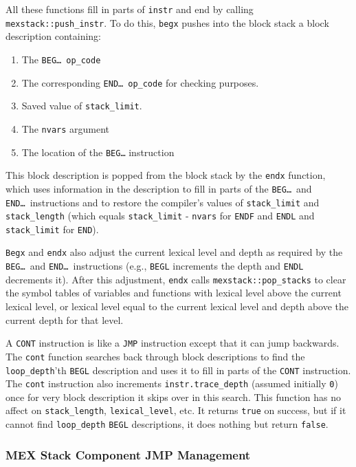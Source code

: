 \documentclass[12pt]{article}
\begin{document}
\begin{indpar}
All these functions fill in parts of {\tt instr} and end by calling
{\tt mexstack::push\_instr}.  To do this, {\tt begx} pushes into the
block stack\label{BLOCK-STACK} a block description containing:
\begin{enumerate}
\item The {\tt BEG\ldots}~{\tt op\_code}
\item The corresponding {\tt END\ldots}~{\tt op\_code} for checking purposes.
\item Saved value of {\tt stack\_limit}.
\item The {\tt nvars} argument
\item The location of the {\tt BEG\ldots} instruction
\end{enumerate}
This block description is popped from the block stack by the {\tt endx}
function, which uses information in the description to fill in parts of the
{\tt BEG\ldots}~and {\tt END\ldots}~instructions and to restore the compiler's
values of {\tt stack\_limit} and {\tt stack\_length} (which equals
{\tt stack\_limit} - {\tt nvars} for {\tt ENDF} and {\tt ENDL}
and {\tt stack\_limit} for {\tt END}).

{\tt Begx} and {\tt endx} also adjust the current lexical level and
depth as required by the {\tt BEG\ldots}~and {\tt END\ldots}~instructions
(e.g., {\tt BEGL} increments the depth and {\tt ENDL} decrements it).
After this adjustment, {\tt endx} calls {\tt mexstack::pop\_stacks}
to clear the symbol tables of variables and functions with
lexical level above the current lexical level, or lexical level
equal to the current lexical level and depth above the current depth
for that level.

A {\tt CONT} instruction is like a {\tt JMP} instruction except that it can
jump backwards.
The {\tt cont} function searches back through block descriptions to find
the {\tt loop\_depth}'th {\tt BEGL} description and uses it
to fill in parts of the {\tt CONT} instruction.  The {\tt cont} instruction
also increments {\tt instr.trace\_depth} (assumed initially {\tt 0})
once for very block description
it skips over in this search.
This function has no affect on {\tt stack\_length}, {\tt lexical\_level},
etc.
It returns {\tt true} on success,
but if it cannot find {\tt loop\_depth} {\tt BEGL} descriptions, it does
nothing but return {\tt false}.
\end{indpar}


\subsubsection{MEX Stack Component JMP Management}
\label{MEX-STACK-COMPONENT-JMP-MANAGEMENT}
\end{document}
